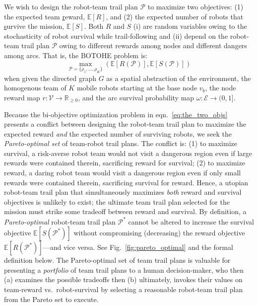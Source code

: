 \documentclass[fleqn,10pt,lineno]{wlpeerj}
\begin{document}
We wish to design the robot-team trail plan $\mathcal{P}$ to maximize two objectives: 
(1) the expected team \underline{r}eward, $\mathbb{E}[R]$, and (2) the expected number of robots that \underline{s}urvive the mission, $\mathbb{E}[S]$. Both $R$ and $S$ (i) are random variables owing to the stochasticity of robot survival while trail-following and (ii) depend on the robot-team trail plan $\mathcal{P}$ owing to different rewards among nodes and different dangers among arcs.
That is, the BOTOHE problem is:
\begin{equation}
	\max_{\mathcal{P}=\{\rho_1, ..., \rho_K\}} \left( \mathbb{E}[R(\mathcal{P})], \mathbb{E}[S(\mathcal{P})] \right)
	\label{eq:the_two_objs}
\end{equation}
when given the directed graph $G$ as a spatial abstraction of the environment, 
the homogenous team of $K$ mobile robots starting at the base node $v_b$,
the node reward map $r: \mathcal{V} \rightarrow \mathbb{R}_{\geq 0}$, and the arc survival probability map $\omega : \mathcal{E} \rightarrow (0, 1]$.

Because the bi-objective optimization problem in eqn.~\ref{eq:the_two_objs} presents a conflict between designing the robot-team trail plan to maximize the expected reward \emph{and} the expected number of surviving robots, we seek the \emph{Pareto-optimal set} \cite{pardalos2017non,branke2008multiobjective} of team-robot trail plans. 
The conflict is: 
(1) to maximize survival, a risk-averse robot team would not visit a dangerous region even if large rewards were contained therein, sacrificing reward for survival; 
(2) to maximize reward, a daring robot team would visit a dangerous region even if only small rewards were contained therein, sacrificing survival for reward. 
Hence, a utopian robot-team trail plan that simultaneously maximizes \emph{both} reward and survival objectives is unlikely to exist; the ultimate team trail plan selected for the mission must strike some tradeoff between reward and survival.
By definition, a \emph{Pareto-optimal} \cite{pardalos2017non,branke2008multiobjective} robot-team trail plan $\mathcal{P}^*$ cannot be altered to increase the survival objective $\mathbb{E}[S(\mathcal{P}^*)]$ without compromising (decreasing) the reward objective $\mathbb{E}[R(\mathcal{P}^*)]$---and vice versa. See Fig.~\ref{fig:pareto_optimal} and the formal definition below.
The Pareto-optimal set of team trail plans is valuable for presenting a \emph{portfolio} of team trail plans to a human decision-maker, who then (a) examines the possible tradeoffs then (b) ultimately, invokes their values on team-reward vs.\  robot-survival by selecting a reasonable robot-team trail plan from the Pareto set to execute.
\end{document}
